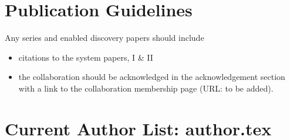\documentclass[a4paper]{article}
\begin{document}


\section{Publication Guidelines}
\label{sec:publ}

Any \sw series and \sw enabled discovery papers should include
\begin{itemize}
\item citations to the \sw system papers, \sw I \& II
\item the collaboration should be acknowledged in the acknowledgement section with a link to the collaboration membership page (URL: to be added).
\end{itemize}


\appendix
\section{Current Author List: author.tex}
\label{sec:appa}
{\small }

\end{document}
